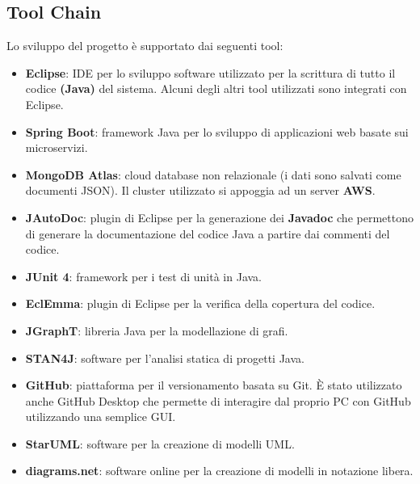 \subsection*{Tool Chain}

Lo sviluppo del progetto è supportato dai seguenti tool:

\begin{itemize}
    \item \textbf{Eclipse}: IDE per lo sviluppo software utilizzato per la scrittura di tutto il codice \textbf{(Java)} del sistema. Alcuni degli altri tool utilizzati sono integrati con Eclipse.
    \item \textbf{Spring Boot}: framework Java per lo sviluppo di applicazioni web basate sui microservizi.
    \item \textbf{MongoDB Atlas}: cloud database non relazionale (i dati sono salvati come documenti JSON). Il cluster utilizzato si appoggia ad un server \textbf{AWS}.
    \item \textbf{JAutoDoc}: plugin di Eclipse per la generazione dei \textbf{Javadoc} che permettono di generare la documentazione del codice Java a partire dai commenti del codice.
    \item \textbf{JUnit 4}: framework per i test di unità in Java.
    \item \textbf{EclEmma}: plugin di Eclipse per la verifica della copertura del codice.
    \item \textbf{JGraphT}: libreria Java per la modellazione di grafi.
    \item \textbf{STAN4J}: software per l’analisi statica di progetti Java.
    \item \textbf{GitHub}: piattaforma per il versionamento basata su Git. È stato utilizzato anche GitHub Desktop che permette di interagire dal proprio PC con GitHub utilizzando una semplice GUI.
    \item \textbf{StarUML}: software per la creazione di modelli UML.
    \item \textbf{diagrams.net}: software online per la creazione di modelli in notazione libera.
\end{itemize}